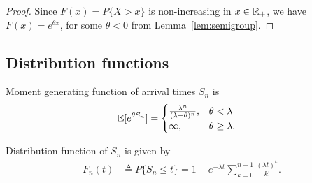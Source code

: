 \documentclass[a4paper,10pt,english]{article}
\begin{document}
\begin{proof}
Since $\bar{F}(x) = P\{X > x\}$  is non-increasing in $x \in \mathbb{R}_+$, we have $\bar{F}(x) = e^{\theta x}$, for some $\theta < 0$ from Lemma~\ref{lem:semigroup}.
\end{proof}

\subsection{Distribution functions}
\begin{lem} Moment generating function of arrival times $S_n$ is 
 \begin{align*}
\mathbb{E}[e^{\theta S_n} ] &= \begin{cases}
\frac{\lambda^n}{(\lambda-\theta)^n}, & \theta < \lambda \\ \infty, & \theta \ge \lambda.
\end{cases} 
 \end{align*} 
\end{lem}
\begin{lem} Distribution function of $S_n$ is given by 
 \begin{align*}
 F_n(t) &\triangleq P\{S_n \leq t\} = 1 - e^{-\lambda t}\sum_{k=0}^{n-1}\frac{(\lambda t)^k}{k!}.
 \end{align*}
\end{lem}
\end{document}
